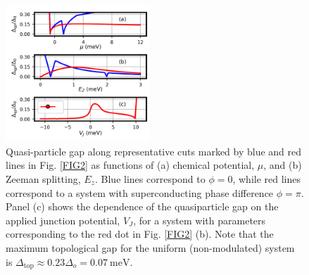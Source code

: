 \documentclass[twocolumn,aps,prb,nofootinbib]{revtex4-2}
\begin{document}
\begin{figure}[t]
\begin{center}
\includegraphics[width=0.48\textwidth]{Fig3.png}
\end{center}
\vspace{-0.6cm}
\caption{Quasi-particle gap along representative cuts marked by blue and red lines in  Fig. \ref{FIG2} as functions of (a) chemical potential, $\mu$, and (b) Zeeman splitting, $E_z$. Blue lines correspond to $\phi = 0$, while red lines correspond to a system with superconducting phase difference $\phi = \pi$. Panel (c) shows the dependence of the quasiparticle gap on the applied junction potential, $V_J$, for a system with parameters corresponding to the red dot in Fig. \ref{FIG2} (b). Note that the maximum topological gap for the uniform (non-modulated) system is $\Delta_{\text{top}} \approx 0.23 \Delta_o = 0.07~\text{meV}$.}
\label{FIG3}
\vspace{-1mm}
\end{figure}
\end{document}
